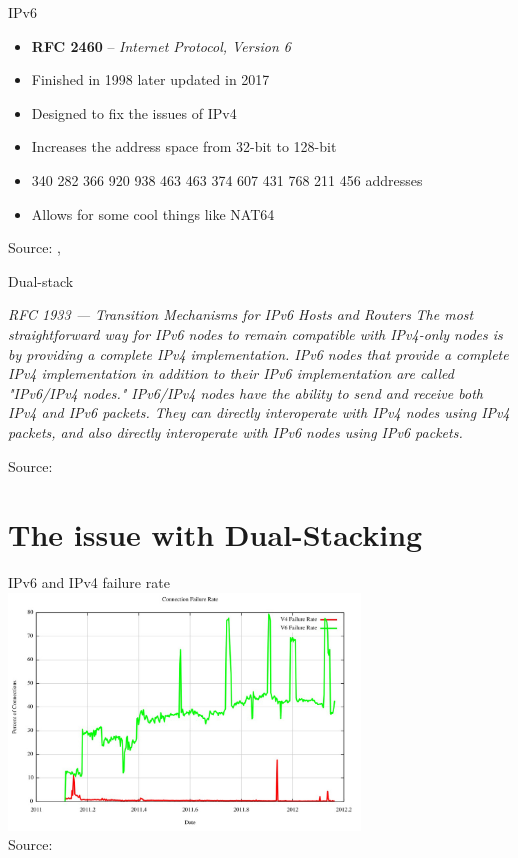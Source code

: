\documentclass[aspectratio=169]{beamer}
\begin{document}
\begin{frame}{IPv6}
  \begin{itemize}
    \item \textbf{RFC 2460} – \emph{Internet Protocol, Version 6}
    \item Finished in 1998 later updated in 2017
    \item Designed to fix the issues of IPv4
    \item Increases the address space from 32-bit to 128-bit
    \item 340 282 366 920 938 463 463 374 607 431 768 211 456 addresses
    \item Allows for some cool things like NAT64
  \end{itemize}
  \centering
  {\tiny Source: \parencite{hindenInternetProtocolVersion1998}, \parencite{deeringInternetProtocolVersion2017}}
\end{frame}

\begin{frame}{Dual-stack}
\small
\begin{block}{\textit{RFC 1933 — Transition Mechanisms for IPv6 Hosts and Routers}}
\vspace{0.5em}
\textit{The most straightforward way for IPv6 nodes to remain compatible with
IPv4-only nodes is by providing a complete IPv4 implementation. IPv6
nodes that provide a complete IPv4 implementation in addition to
their IPv6 implementation are called "IPv6/IPv4 nodes." IPv6/IPv4
nodes have the ability to send and receive both IPv4 and IPv6
packets. They can directly interoperate with IPv4 nodes using IPv4
packets, and also directly interoperate with IPv6 nodes using IPv6
packets.}
\end{block}
\centering
{\tiny Source: \parencite{nordmarkTransitionMechanismsIPv61996}}
\end{frame}

\section{The issue with Dual-Stacking}
\begin{frame}{IPv6 and IPv4 failure rate}
  \centering
  \includegraphics[width=0.7\textwidth]{fig2.jpg}
  \\
  {\tiny Source: \parencite{ISPColumnNovember}}
\end{frame}
\end{document}
